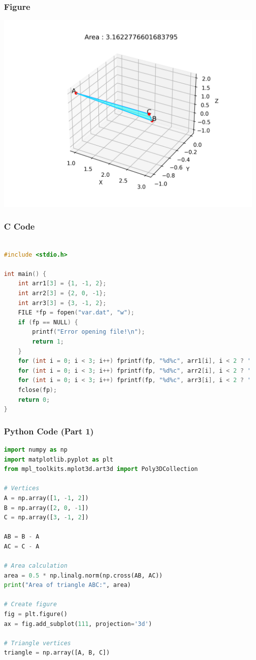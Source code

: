 \documentclass{beamer}
\begin{document}
\begin{frame}
\frametitle{Figure}
\begin{center}
\includegraphics[width=0.7\linewidth]{figs/fig.png}
\end{center}
\end{frame}

\begin{frame}[fragile]
\frametitle{C Code}
\begin{lstlisting}[language=C]

#include <stdio.h>

int main() {
	int arr1[3] = {1, -1, 2};
	int arr2[3] = {2, 0, -1};
	int arr3[3] = {3, -1, 2};
	FILE *fp = fopen("var.dat", "w");
	if (fp == NULL) {
		printf("Error opening file!\n");
		return 1;
	}
	for (int i = 0; i < 3; i++) fprintf(fp, "%d%c", arr1[i], i < 2 ? ' ' : '\n');
	for (int i = 0; i < 3; i++) fprintf(fp, "%d%c", arr2[i], i < 2 ? ' ' : '\n');
	for (int i = 0; i < 3; i++) fprintf(fp, "%d%c", arr3[i], i < 2 ? ' ' : '\n');
	fclose(fp);
	return 0;
}

\end{lstlisting}
\end{frame}



\begin{frame}[fragile]
\frametitle{Python Code (Part 1)}
\begin{lstlisting}[language=Python]
import numpy as np
import matplotlib.pyplot as plt
from mpl_toolkits.mplot3d.art3d import Poly3DCollection

# Vertices
A = np.array([1, -1, 2])
B = np.array([2, 0, -1])
C = np.array([3, -1, 2]) 

AB = B - A
AC = C - A

# Area calculation
area = 0.5 * np.linalg.norm(np.cross(AB, AC))
print("Area of triangle ABC:", area)

# Create figure
fig = plt.figure()
ax = fig.add_subplot(111, projection='3d')

# Triangle vertices
triangle = np.array([A, B, C])

\end{lstlisting}
\end{frame}
\end{document}
